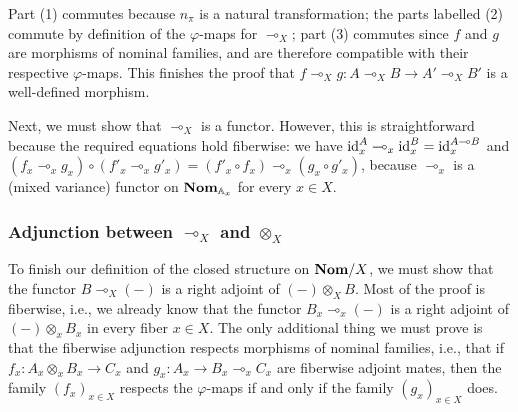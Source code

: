 \documentclass[11pt,a4paper]{amsart}
\theoremstyle{plain}
\theoremstyle{definition}
\theoremstyle{remark}
\newcommand{\Nom}{\textrm{\bf Nom}}
\newcommand{\NomAX}[1]{\Nom_{\aA_{#1}}}
\newcommand{\aA}{\mathbb{A}}
\newcommand{\nn}{n}
\newcommand{\id}{\text{\textrm{id}}}
\begin{document}
Part (1) commutes because $\nn_{\pi}$ is a natural transformation; the
parts labelled (2) commute by definition of the $\varphi$-maps for
$\multimap_X$; part (3) commutes since $f$ and $g$ are morphisms of
nominal families, and are therefore compatible with their respective
$\varphi$-maps.  This finishes the proof that $f\multimap_X g:A\multimap_X
B\to A'\multimap_X B'$ is a well-defined morphism.

Next, we must show that $\multimap_X$ is a functor. However, this is
straightforward because the required equations hold fiberwise: we have
$\id^A_x \multimap_x \id^B_x = \id^{A \multimap B}_x$ and
$(f_x\multimap_x g_x)\circ (f'_x\multimap_x g'_x)=(f'_x\circ f_x)
\multimap_x (g_x\circ g'_x)$, because $\multimap_x$ is a (mixed
variance) functor on $\NomAX{x}$ for every $x\in X$.

\subsubsection{Adjunction between $\multimap_X$ and $\otimes_X$}

To finish our definition of the closed structure on $\Nom/X$, we must
show that the functor $B\multimap_X (-)$ is a right adjoint of
$(-)\otimes_X B$. Most of the proof is fiberwise, i.e., we already
know that the functor $B_x\multimap_x(-)$ is a right adjoint of
$(-)\otimes_x B_x$ in every fiber $x\in X$.  The only additional thing
we must prove is that the fiberwise adjunction respects morphisms of
nominal families, i.e., that if $f_x:A_x\otimes_x B_x\to C_x$ and
$g_x:A_x\to B_x\multimap_x C_x$ are fiberwise adjoint mates, then the
family $(f_x)_{x\in X}$ respects the $\varphi$-maps if and only if the
family $(g_x)_{x\in X}$ does.
\end{document}
